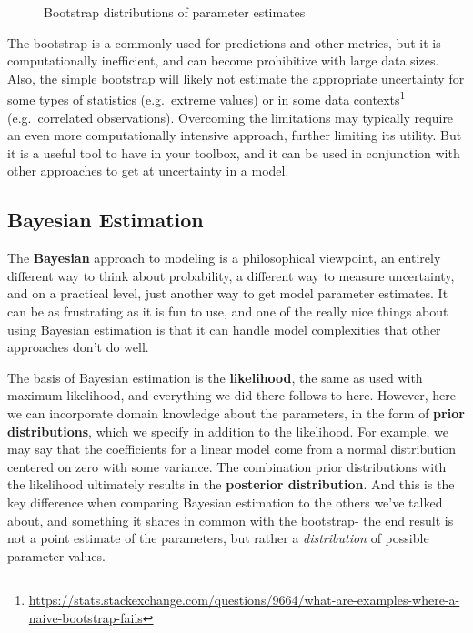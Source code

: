\documentclass[
  letterpaper,
]{krantz}
\DeclareRobustCommand{\href}[2]{#2\footnote{\url{#1}}}
\begin{document}
\begin{figure}[H]


\caption{\label{fig-r-bootstrap}Bootstrap distributions of parameter
estimates}

\end{figure}%

The bootstrap is a commonly used for predictions and other metrics, but
it is computationally inefficient, and can become prohibitive with large
data sizes. Also, the simple bootstrap will likely not estimate the
appropriate uncertainty for some types of statistics (e.g.~extreme
values) or
\href{https://stats.stackexchange.com/questions/9664/what-are-examples-where-a-naive-bootstrap-fails}{in
some data contexts} (e.g.~correlated observations). Overcoming the
limitations may typically require an even more computationally intensive
approach, further limiting its utility. But it is a useful tool to have
in your toolbox, and it can be used in conjunction with other approaches
to get at uncertainty in a model.

\subsection{Bayesian Estimation}\label{sec-estim-bayes}

The \textbf{Bayesian} approach to modeling is a philosophical viewpoint,
an entirely different way to think about probability, a different way to
measure uncertainty, and on a practical level, just another way to get
model parameter estimates. It can be as frustrating as it is fun to use,
and one of the really nice things about using Bayesian estimation is
that it can handle model complexities that other approaches don't do
well.

The basis of Bayesian estimation is the \textbf{likelihood}, the same as
used with maximum likelihood, and everything we did there follows to
here. However, here we can incorporate domain knowledge about the
parameters, in the form of \textbf{prior distributions}, which we
specify in addition to the likelihood. For example, we may say that the
coefficients for a linear model come from a normal distribution centered
on zero with some variance. The combination prior distributions with the
likelihood ultimately results in the \textbf{posterior distribution}.
And this is the key difference when comparing Bayesian estimation to the
others we've talked about, and something it shares in common with the
bootstrap- the end result is not a point estimate of the parameters, but
rather a \emph{distribution} of possible parameter values.
\end{document}
